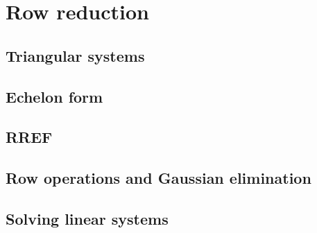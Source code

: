 
\chapter{Row reduction}
\label{ch:row}

\section{Triangular systems}
\label{sec:tri}

\section{Echelon form}
\label{sec:echelon}

\section{RREF}
\label{sec:rref}

\section{Row operations and Gaussian elimination}
\label{sec:row_ops}

\section{Solving linear systems}
\label{sec:solv}

